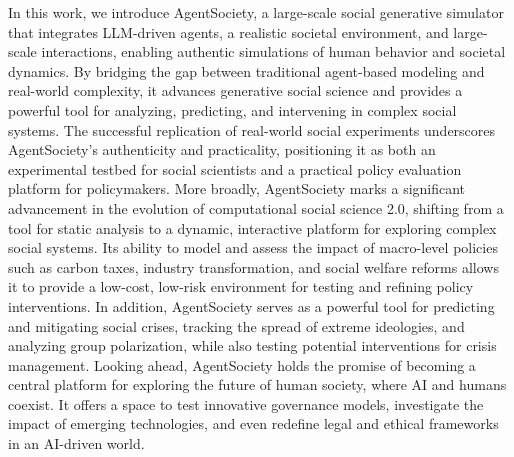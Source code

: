In this work, we introduce AgentSociety, a large-scale social generative simulator that integrates LLM-driven agents, a realistic societal environment, and large-scale interactions, enabling authentic simulations of human behavior and societal dynamics. By bridging the gap between traditional agent-based modeling and real-world complexity, it advances generative social science and provides a powerful tool for analyzing, predicting, and intervening in complex social systems. The successful replication of real-world social experiments underscores AgentSociety's authenticity and practicality, positioning it as both an experimental testbed for social scientists and a practical policy evaluation platform for policymakers. More broadly, AgentSociety marks a significant advancement in the evolution of computational social science 2.0, shifting from a tool for static analysis to a dynamic, interactive platform for exploring complex social systems. Its ability to model and assess the impact of macro-level policies such as carbon taxes, industry transformation, and social welfare reforms allows it to provide a low-cost, low-risk environment for testing and refining policy interventions. In addition, AgentSociety serves as a powerful tool for predicting and mitigating social crises, tracking the spread of extreme ideologies, and analyzing group polarization, while also testing potential interventions for crisis management. Looking ahead, AgentSociety holds the promise of becoming a central platform for exploring the future of human society, where AI and humans coexist. It offers a space to test innovative governance models, investigate the impact of emerging technologies, and even redefine legal and ethical frameworks in an AI-driven world.










